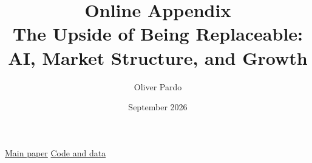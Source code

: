 \documentclass[11pt]{article}
\title{Online Appendix\\[0.5em]\large The Upside of Being Replaceable:\\AI, Market Structure, and Growth}
\author{Oliver Pardo}
\date{September 2026}
\theoremstyle{remark}
\numberwithin{equation}{section}
\begin{document}
\maketitle
\begin{center}
\small
\href{https://oliverpardo1979.github.io/ai-growth-and-labor/paper/the-future-of-growth-and-human-labor-under-recursive-ai-self-improvement.pdf}{Main paper}
\quad\textbar\quad
\href{https://github.com/oliverpardo1979/ai-growth-and-labor}{Code and data}
\end{center}
\begingroup
\singlespacing
\small
\setcounter{tocdepth}{2}
\tableofcontents
\endgroup
\clearpage
\onehalfspacing

\clearpage

\clearpage

\clearpage

\clearpage

\end{document}
